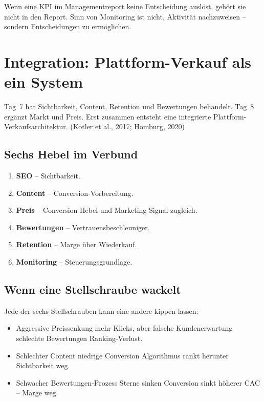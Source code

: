 \documentclass[11pt,a4paper,oneside]{article}
\newcommand{\quelle}[1]{{\footnotesize\color{lpGray}(#1)}}
\begin{document}
\begin{merkbox}
Wenn eine KPI im Managementreport keine Entscheidung auslöst, gehört sie nicht in den Report. Sinn von Monitoring ist nicht, Aktivität nachzuweisen -- sondern Entscheidungen zu ermöglichen.
\end{merkbox}

\section{Integration: Plattform-Verkauf als ein System}

Tag~7 hat Sichtbarkeit, Content, Retention und Bewertungen behandelt. Tag~8 ergänzt Markt und Preis. Erst zusammen entsteht eine integrierte Plattform-Verkaufsarchitektur. \quelle{Kotler et al., 2017; Homburg, 2020}

\subsection{Sechs Hebel im Verbund}

\begin{enumerate}
  \item \textbf{SEO} -- Sichtbarkeit.
  \item \textbf{Content} -- Conversion-Vorbereitung.
  \item \textbf{Preis} -- Conversion-Hebel und Marketing-Signal zugleich.
  \item \textbf{Bewertungen} -- Vertrauensbeschleuniger.
  \item \textbf{Retention} -- Marge über Wiederkauf.
  \item \textbf{Monitoring} -- Steuerungsgrundlage.
\end{enumerate}

\subsection{Wenn eine Stellschraube wackelt}

Jede der sechs Stellschrauben kann eine andere kippen lassen:

\begin{itemize}
  \item Aggressive Preissenkung \textrightarrow{} mehr Klicks, aber falsche Kundenerwartung \textrightarrow{} schlechte Bewertungen \textrightarrow{} Ranking-Verlust.
  \item Schlechter Content \textrightarrow{} niedrige Conversion \textrightarrow{} Algorithmus rankt herunter \textrightarrow{} Sichtbarkeit weg.
  \item Schwacher Bewertungen-Prozess \textrightarrow{} Sterne sinken \textrightarrow{} Conversion sinkt \textrightarrow{} höherer CAC -- Marge weg.
\end{itemize}
\end{document}
